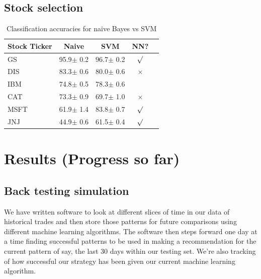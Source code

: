 \documentclass{article}
\begin{document}
\subsection{Stock selection}

\begin{table}[h]
\caption{Classification accuracies for naive Bayes vs SVM}
\label{sample-table}
\vskip 0.15in
\begin{center}
\begin{small}
\begin{sc}
\begin{tabular}{lcccr}
\hline
\abovespace\belowspace
Stock Ticker & Naive & SVM & NN? \\
\hline
\abovespace
GS    & 95.9$\pm$ 0.2& 96.7$\pm$ 0.2& $\surd$ \\
DIS & 83.3$\pm$ 0.6& 80.0$\pm$ 0.6& $\times$\\
IBM    & 74.8$\pm$ 0.5& 78.3$\pm$ 0.6&         \\
CAT     & 73.3$\pm$ 0.9& 69.7$\pm$ 1.0& $\times$\\
MSFT    & 61.9$\pm$ 1.4& 83.8$\pm$ 0.7& $\surd$ \\
\belowspace
JNJ   & 44.9$\pm$ 0.6& 61.5$\pm$ 0.4& $\surd$ \\
\hline
\end{tabular}
\end{sc}
\end{small}
\end{center}
\vskip -0.1in
\end{table}


\section{Results (Progress so far)}

\subsection{Back testing simulation}

We have written software to look at different slices of time in our data of historical trades and then store those patterns for future comparisons using different machine learning algorithms.  The software then steps forward one day at a time finding successful patterns to be used in making a recommendation for the current pattern of say, the last 30 days within our testing set.  We're also tracking of how successful our strategy has been given our current machine learning algorithm.
\end{document}
